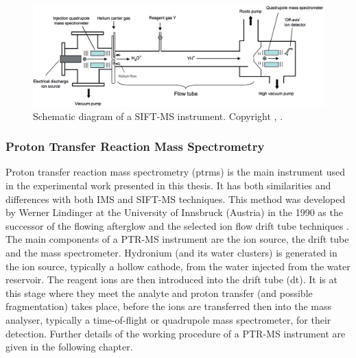 \begin{figure}%
\centering
    \includegraphics[width=0.95\linewidth]{pics/sift.png}
    \caption{Schematic diagram of a SIFT-MS instrument. Copyright \textcopyright  \citeauthor{ellis2013proton},  \citeyear{ellis2013proton}.}
    \label{fig:sift}
\end{figure}




\subsubsection{Proton Transfer Reaction Mass Spectrometry}
Proton transfer reaction mass spectrometry (\acrshort{ptrms}) is the main instrument used in the experimental work presented in this thesis.
It has both similarities and differences with both IMS and SIFT-MS techniques. This method was developed by Werner Lindinger at the University of Innsbruck (Austria) in the 1990 as the successor of the flowing afterglow  and the selected ion flow drift tube techniques \cite{RN601}.
The main components of a PTR-MS instrument are the ion source, the drift tube and the mass spectrometer.
Hydronium (and its water clusters) is generated in the ion source, typically a hollow cathode, from the water injected from the water reservoir. The reagent ions are then introduced into the drift tube (\acrshort{dt}). It is at this stage where they meet the analyte and proton transfer (and possible fragmentation) takes place, before the ions  are transferred then into the mass analyser, typically a time-of-flight or quadrupole mass spectrometer, for their detection. Further details of the working procedure of a PTR-MS instrument are given in the following chapter.

